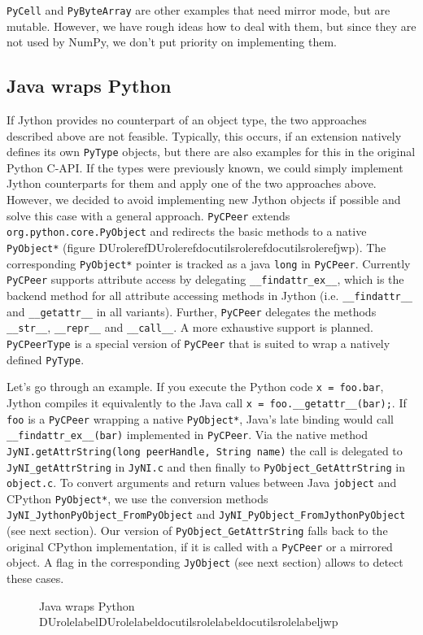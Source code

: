\documentclass[letterpaper,compsoc,twoside]{IEEEtran}
\providecommand*{\DUrole}[2]{\ifcsname DUrole#1\endcsname \csname DUrole#1\endcsname{#2}\else \ifcsname docutilsrole#1\endcsname \csname docutilsrole#1\endcsname{#2}\else #2\fi \fi }
\begin{document}
\texttt{PyCell} and \texttt{PyByteArray} are other examples that need mirror mode, but are mutable. However, we have rough ideas how to deal with them, but since they are not used by NumPy, we don't put priority on implementing them.

\subsection{Java wraps Python\label{java-wraps-python}}


If Jython provides no counterpart of an object type, the two approaches described above are not feasible.
Typically, this occurs, if an extension natively defines its own \texttt{PyType} objects, but there are also examples for this in the original Python C-API. If the types were previously known, we could simply implement Jython counterparts for them and apply one of the two approaches above. However, we decided to avoid implementing new Jython objects if possible and solve this case with a general approach.
\texttt{PyCPeer} extends \texttt{org.python.core.PyObject} and redirects the basic methods to a native \texttt{PyObject*} (figure \DUrole{ref}{jwp}).
The corresponding \texttt{PyObject*} pointer is tracked as a java \texttt{long} in \texttt{PyCPeer}. Currently \texttt{PyCPeer} supports attribute access by delegating \texttt{\_\_findattr\_ex\_\_}, which is the backend method for all attribute accessing methods in Jython (i.e. \texttt{\_\_findattr\_\_} and \texttt{\_\_getattr\_\_} in all variants). Further, \texttt{PyCPeer} delegates the methods \texttt{\_\_str\_\_}, \texttt{\_\_repr\_\_} and \texttt{\_\_call\_\_}. A more exhaustive support is planned. \texttt{PyCPeerType} is a special version of \texttt{PyCPeer} that is suited to wrap a natively defined \texttt{PyType}.

Let's go through an example. If you execute the Python code \textquotedbl{}\texttt{x = foo.bar}\textquotedbl{},
Jython compiles it equivalently to the Java call \textquotedbl{}\texttt{x = foo.\_\_getattr\_\_(\textquotedbl{}bar\textquotedbl{});}\textquotedbl{}. If \texttt{foo} is a \texttt{PyCPeer} wrapping a native \texttt{PyObject*}, Java's late binding would call \texttt{\_\_findattr\_ex\_\_(\textquotedbl{}bar\textquotedbl{})} implemented in \texttt{PyCPeer}. Via the native method \texttt{JyNI.getAttrString(long peerHandle, String name)} the call is delegated to \texttt{JyNI\_getAttrString} in \texttt{JyNI.c} and then finally to \texttt{PyObject\_GetAttrString} in \texttt{object.c}. To convert arguments and return values between Java \texttt{jobject} and CPython \texttt{PyObject*}, we use the conversion methods \texttt{JyNI\_JythonPyObject\_FromPyObject} and \texttt{JyNI\_PyObject\_FromJythonPyObject} (see next section). Our version of \texttt{PyObject\_GetAttrString} falls back to the original CPython implementation, if it is called with a \texttt{PyCPeer} or a mirrored object. A flag in the corresponding \texttt{JyObject} (see next section) allows to detect these cases.\begin{figure}[]\noindent{}
\caption{Java wraps Python \DUrole{label}{jwp}}
\end{figure}
\end{document}
